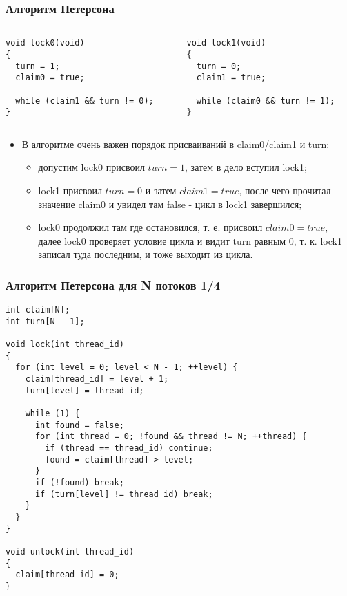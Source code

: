 \begin{frame}[fragile]
\frametitle{Алгоритм Петерсона}
\begin{columns}
  \begin{column}{.45\linewidth}
    \begin{lstlisting}
void lock0(void)
{
  turn = 1;
  claim0 = true;

  while (claim1 && turn != 0);
}
    \end{lstlisting}
  \end{column}
  \begin{column}{.45\linewidth}
    \begin{lstlisting}
void lock1(void)
{
  turn = 0;
  claim1 = true;

  while (claim0 && turn != 1);
}
    \end{lstlisting}
  \end{column}
\end{columns}
\begin{itemize}
  \item В алгоритме очень важен порядок присваиваний в claim0/claim1 и turn:
  \begin{itemize}
    \item допустим lock0 присвоил $turn = 1$, затем в дело вступил lock1;
    \item lock1 присвоил $turn = 0$ и затем $claim1 = true$, после чего
    прочитал значение claim0 и увидел там false - цикл в lock1 завершился;
    \item lock0 продолжил там где остановился, т. е. присвоил $claim0 = true$,
    далее lock0 проверяет условие цикла и видит turn равным 0, т. к. lock1
    записал туда последним, и тоже выходит из цикла.
  \end{itemize}
\end{itemize}
\end{frame}

\begin{frame}[fragile]
\frametitle{Алгоритм Петерсона для N потоков 1/4}
\begin{lstlisting}
int claim[N];
int turn[N - 1];

void lock(int thread_id)
{
  for (int level = 0; level < N - 1; ++level) {
    claim[thread_id] = level + 1;
    turn[level] = thread_id;

    while (1) {
      int found = false;
      for (int thread = 0; !found && thread != N; ++thread) {
        if (thread == thread_id) continue;
        found = claim[thread] > level;
      }
      if (!found) break;
      if (turn[level] != thread_id) break;
    }
  }
}

void unlock(int thread_id)
{
  claim[thread_id] = 0;
}
\end{lstlisting}
\end{frame}

